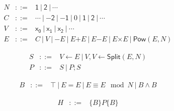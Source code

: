 
\begin{eqnarray*}
  N & ::= & \mathsf{1}\ |\ \mathsf{2}\ |\ \cdots\\
  C & ::= & \cdots \ |\ \mathsf{-2}\ |\ \mathsf{-1} \ |\ 0\ |\ 
            \mathsf{1}\ |\ \mathsf{2}\ |\ \cdots\\
  V & ::= & \mathsf{x_0}\ |\ \mathsf{x_1}\ |\ \mathsf{x_2}\ |\ \cdots\\
  E & ::= &  C \ |\ V \ |\  \mathsf{-}E \ |\ E \mathsf{+} E 
             \ |\ E \mathsf{-} E
             \ |\ E \mathsf{\times} E \ |\ \mathsf{Pow} (E, N)
\end{eqnarray*}

\begin{eqnarray*}
  S & ::= & V \mathsf{\leftarrow} E 
            \ |\  V, V \mathsf{\leftarrow} \mathsf{Split} (E, N)\\
  P & ::= & S \ |\ P; S
\end{eqnarray*}

\begin{eqnarray*}
  B & ::= & \mathsf{\top}
     \ |\   E \mathsf{=} E
     \ |\   E \mathsf{\equiv} E \mod N
     \ |\   B \wedge B
\end{eqnarray*}

\begin{eqnarray*}
  H & ::= & \{ B \} P \{ B \}
\end{eqnarray*}